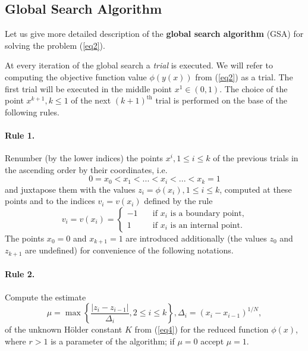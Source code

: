 \documentclass[runningheads]{llncs}
\begin{document}
\subsection{Global Search Algorithm}


Let us give more detailed description of the \textbf{global search algorithm} (GSA) for solving the problem (\ref{eq2}).

At every iteration of the global search a \textit{trial} is executed. We will refer to computing the objective function value  $\phi (y(x))$ from (\ref{eq2}) as a trial. The first trial will be executed in the middle point $x^1 \in (0,1)$. The choice of the point $x^{k+1}, k \leq 1$ of the next $(k+1)^\text{th}$ trial is performed on the base of the following rules.

\paragraph{Rule 1.} Renumber (by the lower indices) the points $x^i, 1 \leq i \leq k$  of the previous trials in the ascending order by their coordinates, i.e.
\begin{equation}\label{eq5} 
0=x_0 < x_1 < ... < x_i < ... < x_k=1
\end{equation}
and juxtapose them with the values $z_i=\phi (x_i), 1 \leq i \leq k$, computed at these points and to the indices $v_i=v(x_i)$ defined by the rule
\begin{equation}\label{eq6} 
v_i=v(x_i)=
  \begin{cases}
    -1 & {\quad \text{if } x_i \text{ is a boundary point,}}\\
    1  & {\quad \text{if } x_i \text{ is an internal point.}}
  \end{cases}
\end{equation}
The points $x_0=0$ and $x_{k+1}=1$ are introduced additionally (the values $z_0$ and $z_{k+1}$ are undefined) for convenience of the following notations.

\paragraph{Rule 2.} Compute the estimate
\begin{equation}\label{eq7} 
\mu = \max\left\{ \frac{|z_i-z_{i-1}|}{\Delta _i}, 2 \leq i \leq k \right\} , \Delta _i= (x_i-x_{i-1})^{1/N},
\end{equation}
of the unknown H{\"o}lder constant $K$ from (\ref{eq4}) for the reduced function $\phi(x)$, where $r>1$ is a parameter of the algorithm; if $\mu=0$ accept $\mu=1$.
\end{document}
